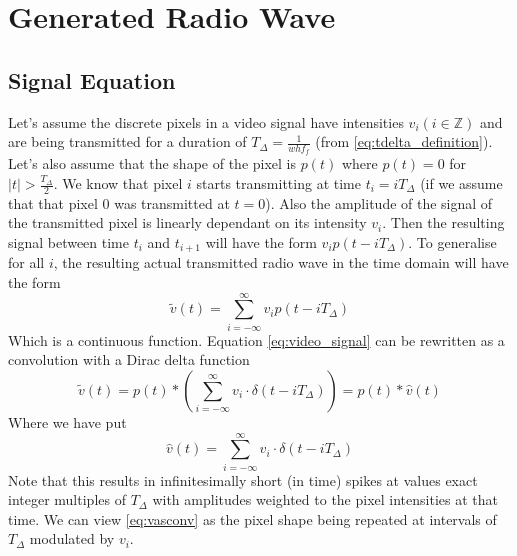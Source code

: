 \documentclass[a4paper,12pt,twoside,openright]{report}
\begin{document}
\section{Generated Radio Wave}

\subsection{Signal Equation}
Let's assume the discrete pixels in a video signal have intensities $v_{i} (i \in \mathbb{Z})$ and are being transmitted for a duration of $T_{\Delta}=\frac{1}{w h f_{f}}$ (from \ref{eq:tdelta_definition}). Let's also assume that the shape of the pixel is $p(t)$ where $p(t)=0$ for $|t| > \frac{T_{\Delta}}{2}$. We know that pixel $i$ starts transmitting at time $t_{i}=i T_{\Delta}$ (if we assume that that pixel 0 was transmitted at $t=0$). Also the amplitude of the signal of the transmitted pixel is linearly dependant on its intensity $v_{i}$. Then the resulting signal between time $t_{i}$ and $t_{i+1}$ will have the form $v_{i} p(t-i T_{\Delta})$. To generalise for all $i$, the resulting actual transmitted radio wave in the time domain will have the form 
\begin{equation}
\label{eq:video_signal}
\tilde{v}(t) = \sum\limits_{i=-\infty}^{\infty} v_{i} p(t-i T_{\Delta})
\end{equation}
Which is a continuous function. Equation \ref{eq:video_signal} can be rewritten as a convolution with a Dirac delta function
\begin{equation}
\label{eq:vasconv}
\tilde{v}(t) = p(t) \ast \left( \sum\limits_{i=-\infty}^{\infty} v_{i} \cdot \delta(t-i T_{\Delta}) \right) = p(t) \ast \hat{v}(t)
\end{equation}
Where we have put
\begin{equation}
\label{eq:vhattdef}
\hat{v}(t) = \sum\limits_{i=-\infty}^{\infty} v_{i} \cdot \delta(t-i T_{\Delta})
\end{equation}
Note that this results in infinitesimally short (in time) spikes at values exact integer multiples of $T_{\Delta}$ with amplitudes weighted to the pixel intensities at that time. We can view \ref{eq:vasconv} as the pixel shape being repeated at intervals of $T_{\Delta}$ modulated by $v_{i}$. 
\end{document}
